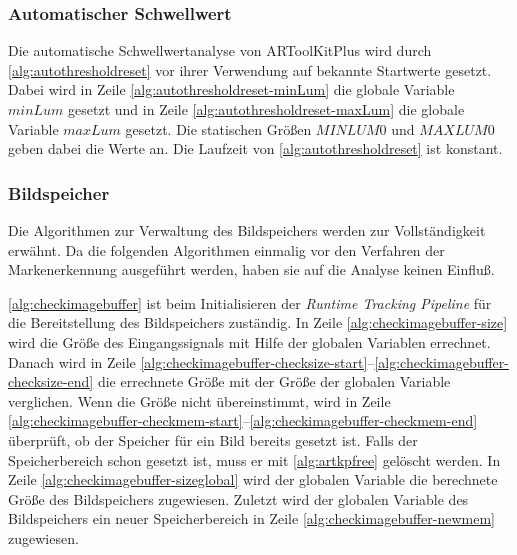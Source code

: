 
\subsubsection{Automatischer Schwellwert} %
\label{sec:automatischer_schwellwert}

Die automatische Schwellwertanalyse von ARToolKitPlus wird durch \autoref{alg:autothresholdreset} vor ihrer Verwendung
 auf bekannte Startwerte gesetzt. Dabei wird in Zeile \ref{alg:autothresholdreset-minLum} die globale Variable
 $\mathit{minLum}$ gesetzt und in Zeile \ref{alg:autothresholdreset-maxLum} die globale Variable $\mathit{maxLum}$
 gesetzt. Die statischen Größen $\mathit{MINLUM0}$ und $\mathit{MAXLUM0}$ geben dabei die Werte an. Die Laufzeit von
 \autoref{alg:autothresholdreset} ist konstant.




\subsubsection{Bildspeicher} %
\label{sec:bildspeicher}

Die Algorithmen zur Verwaltung des Bildspeichers werden zur Vollständigkeit erwähnt. Da die folgenden Algorithmen
 einmalig vor den Verfahren der Markenerkennung ausgeführt werden, haben sie auf die Analyse keinen Einfluß.

\autoref{alg:checkimagebuffer} ist beim Initialisieren der \textit{Runtime Tracking Pipeline} für die Bereitstellung
 des Bildspeichers zuständig. In Zeile \ref{alg:checkimagebuffer-size} wird die Größe des Eingangssignals mit Hilfe der
 globalen Variablen errechnet. Danach wird in Zeile
 \ref{alg:checkimagebuffer-checksize-start}--\ref{alg:checkimagebuffer-checksize-end} die errechnete Größe mit der
 Größe der globalen Variable verglichen. Wenn die Größe nicht übereinstimmt, wird in Zeile
 \ref{alg:checkimagebuffer-checkmem-start}--\ref{alg:checkimagebuffer-checkmem-end} überprüft, ob der Speicher für ein
 Bild bereits gesetzt ist. Falls der Speicherbereich schon gesetzt ist, muss er mit \autoref{alg:artkpfree} gelöscht
 werden. In Zeile \ref{alg:checkimagebuffer-sizeglobal} wird der globalen Variable die berechnete Größe des
 Bildspeichers zugewiesen. Zuletzt wird der globalen Variable des Bildspeichers ein neuer Speicherbereich in Zeile
 \ref{alg:checkimagebuffer-newmem} zugewiesen.


